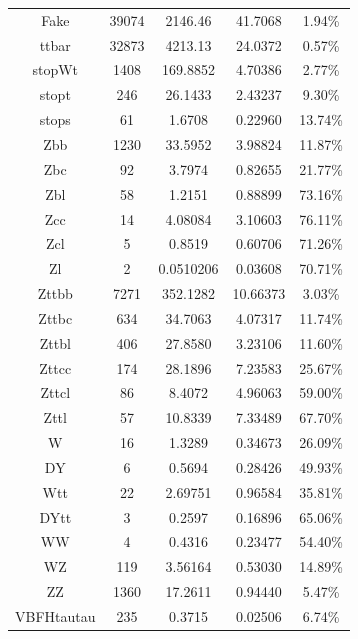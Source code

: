 \begin{table}
\begin{tabular}{|c|c|c|c|c|}
  	Fake 	&  39074	&	2146.46	&	41.7068  &	1.94\% \\
	ttbar           & 32873 &	4213.13     &	24.0372  &	0.57\% \\
	stopWt       & 1408   &	169.8852   &	4.70386  &	2.77\% \\
	stopt          & 246     &	26.1433     &	2.43237  &	9.30\% \\
	stops          & 61      &	1.6708       &	0.22960  &	13.74\% \\
	Zbb            & 1230   &	33.5952     &	3.98824  &	11.87\% \\
	Zbc            & 92       &	3.7974       &	0.82655  &	21.77\% \\
	Zbl             & 58       &	1.2151       &	0.88899  &	73.16\% \\
	Zcc            & 14       &	4.08084     &	3.10603  &	76.11\% \\
	Zcl             & 5         &	0.8519       &	0.60706  &	71.26\% \\
	Zl               & 2         &	0.0510206 &	0.03608  &	70.71\% \\
	Zttbb          & 7271   &	352.1282   &	10.66373&	3.03\% \\
	Zttbc           & 634    &	34.7063     &	4.07317  &	11.74\% \\
	Zttbl            & 406    &	27.8580     &	3.23106  &	11.60\% \\	
	Zttcc           & 174    &	28.1896     &	7.23583  &	25.67\% \\	
	Zttcl            & 86      &	8.4072       &	4.96063  &	59.00\% \\
	Zttl              & 57      &	10.8339     &	7.33489  &	67.70\% \\
	W                & 16      &	1.3289       &	0.34673  &	26.09\% \\	
	DY              & 6         &	0.5694       &	0.28426  &	49.93\% \\
	Wtt              & 22      &	2.69751     &	0.96584  &	35.81\% \\
	DYtt             & 3        &	0.2597       &	0.16896  &	65.06\% \\
	WW             & 4        &	0.4316       &	0.23477  &	54.40\% \\
	WZ               & 119   &	3.56164     &	0.53030  &	14.89\% \\
	ZZ                & 1360 &	17.2611     &	0.94440  &	5.47\% \\
	VBFHtautau & 235   &	0.3715       &	0.02506  &	6.74\% \\	

\end{tabular}
\end{table}
